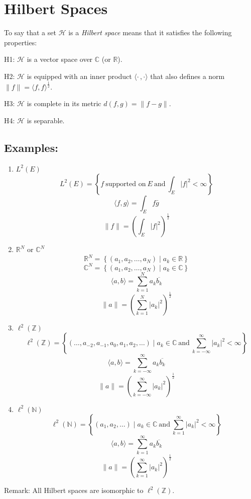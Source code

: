 \documentclass[letterpaper,12pt,fleqn]{article}
\newcommand{\abs}[1]{\left|#1\right|}
\newcommand{\norm}[1]{\lVert#1\rVert}
\newcommand{\inner}[2]{\langle#1,#2\rangle}
\newcommand{\conj}[1]{\bar{#1}}
\newcommand{\Conj}[1]{\overline{#1}}
\newcommand{\hilbert}{\mathcal{H}}
\begin{document}
\section*{Hilbert Spaces}

\begin{definition}
To say that a set $\hilbert$ is a \emph{Hilbert space} means that it
satisfies the following properties:
\begin{description}
\item{H1: } $\hilbert$ is a vector space over $\mathbb{C}$ (or $\mathbb{R}$).

\item{H2: } $\hilbert$ is equipped with an inner product
$\inner{\cdot\,}{\cdot}$ that also defines a norm
$\norm{f}=\inner{f}{f}^{\frac{1}{2}}$.

\item{H3: } $\hilbert$ is complete in its metric $d(f,g)=\norm{f-g}$.

\item{H4: } $\hilbert$ is separable.
\end{description}
\end{definition}

\subsection{Examples:}
\begin{enumerate}
\item{$L^2(E)$}
\[L^2(E)=\left\{f\ \mbox{supported on}\ E\ \mbox{and}\ \int_E\abs{f}^2
    <\infty\right\}\]
\[\inner{f}{g}=\int_Ef\conj{g}\]
\[\norm{f}=\left(\int_E\abs{f}^2\right)^{\frac{1}{2}}\]

\item{$\mathbb{R}^N$ or $\mathbb{C}^N$}
\[\mathbb{R}^N=\left\{(a_1,a_2,\ldots,a_N)\mid a_k\in\mathbb{R}\right\}\]
\[\mathbb{C}^N=\left\{(a_1,a_2,\ldots,a_N)\mid a_k\in\mathbb{C}\right\}\]
\[\inner{a}{b}=\sum_{k=1}^Na_k\Conj{b_k}\]
\[\norm{a}=\left(\sum_{k=1}^N\abs{a_k}^2\right)^{\frac{1}{2}}\]

\item{$\ell^2(\mathbb{Z})$}
\[\ell^2(\mathbb{Z})=\left\{(\ldots,a_{-2},a_{-1},a_0,a_1,a_2,\ldots)\mid
    a_k\in\mathbb{C}\ \mbox{and}\ \sum_{k=-\infty}^{\infty}\abs{a_k}^2<
    \infty\right\}\]
\[\inner{a}{b}=\sum_{k=-\infty}^{\infty}a_k\Conj{b_k}\]
\[\norm{a}=\left(\sum_{k=-\infty}^{\infty}\abs{a_k}^2\right)^{\frac{1}{2}}\]

\item{$\ell^2(\mathbb{N})$}
\[\ell^2(\mathbb{N})=\left\{(a_1,a_2,\ldots)\mid
    a_k\in\mathbb{C}\ \mbox{and}\ \sum_{k=1}^{\infty}\abs{a_k}^2<
    \infty\right\}\]
\[\inner{a}{b}=\sum_{k=1}^{\infty}a_k\Conj{b_k}\]
\[\norm{a}=\left(\sum_{k=1}^{\infty}\abs{a_k}^2\right)^{\frac{1}{2}}\]
\end{enumerate}

Remark: All Hilbert spaces are isomorphic to $\ell^2(\mathbb{Z})$.
\end{document}
